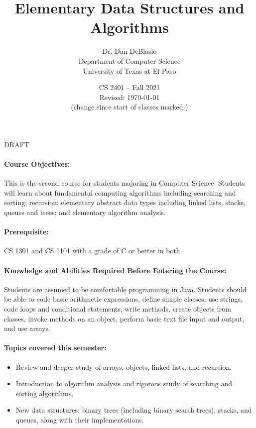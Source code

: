 \documentclass[12pt]{scrartcl}
\title{Elementary Data Structures and Algorithms}\let\Title\@title
\subtitle{
{\small
\vskip0.5cm
Dr. Dan DeBlasio\\
Department of Computer Science \\
University of Texas at El Paso}
\vskip-1cm}
\date{\small CS 2401 -- Fall 2021\\ \vspace{1em}Revised: \today\\(change since start of classes marked \change{}{in orange})}
\begin{document}

\maketitle

\begin{center}
{\Huge\color{red}DRAFT}
\end{center}
\paragraph{Course Objectives:} This is the second course for students majoring in Computer Science. Students will learn about fundamental computing algorithms including searching and sorting; recursion; elementary abstract data types including linked lists, stacks, queues and trees; and elementary algorithm analysis. 
\tagmcend

\paragraph{Prerequisite:} CS 1301 and CS 1101 with a grade of C or better in both. 

\paragraph{Knowledge and Abilities Required Before Entering the Course:} Students are assumed to be comfortable programming in Java. Students should be able to code basic arithmetic expressions, define simple classes, use strings, code loops and conditional statements, write methods, create objects from classes, invoke methods on an object, perform basic text file input and output, and use arrays.

\paragraph{Topics covered this semester:}
\begin{itemize} 
\item Review and deeper study of arrays, objects, linked lists, and recursion. 
\item Introduction to algorithm analysis and rigorous study of searching and sorting algorithms. 
\item New data structures: binary trees (including binary search trees), stacks, and queues, along with their implementations. 
\end{itemize}
\end{document}
